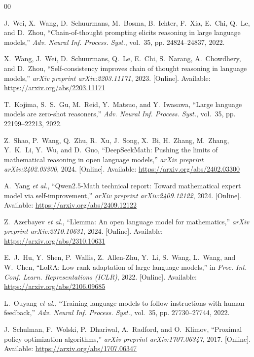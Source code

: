 \documentclass{ieeeaccess}
\begin{document}
\begin{thebibliography}{00}

J.~Wei, X.~Wang, D.~Schuurmans, M.~Bosma, B.~Ichter, F.~Xia, E.~Chi,
Q.~Le, and D.~Zhou,
``Chain-of-thought prompting elicits reasoning in large language models,''
\emph{Adv. Neural Inf. Process. Syst.}, vol.~35, pp. 24824--24837, 2022.

X.~Wang, J.~Wei, D.~Schuurmans, Q.~Le, E.~Chi, S.~Narang, A.~Chowdhery,
and D.~Zhou,
``Self-consistency improves chain of thought reasoning in language models,''
\emph{arXiv preprint arXiv:2203.11171}, 2023. [Online]. Available:
\underline{https://arxiv.org/abs/2203.11171}

T.~Kojima, S.~S.~Gu, M.~Reid, Y.~Matsuo, and Y.~Iwasawa,
``Large language models are zero-shot reasoners,''
\emph{Adv. Neural Inf. Process. Syst.}, vol.~35, pp. 22199--22213, 2022.

Z.~Shao, P.~Wang, Q.~Zhu, R.~Xu, J.~Song, X.~Bi, H.~Zhang, M.~Zhang,
Y.~K.~Li, Y.~Wu, and D.~Guo,
``{DeepSeekMath}: Pushing the limits of mathematical reasoning in open
language models,''
\emph{arXiv preprint arXiv:2402.03300}, 2024. [Online]. Available:
\underline{https://arxiv.org/abs/2402.03300}

A.~Yang \emph{et al.},
``{Qwen2.5-Math} technical report: Toward mathematical expert model via
self-improvement,''
\emph{arXiv preprint arXiv:2409.12122}, 2024. [Online]. Available:
\underline{https://arxiv.org/abs/2409.12122}

Z.~Azerbayev \emph{et al.},
``{Llemma}: An open language model for mathematics,''
\emph{arXiv preprint arXiv:2310.10631}, 2024. [Online]. Available:
\underline{https://arxiv.org/abs/2310.10631}

E.~J.~Hu, Y.~Shen, P.~Wallis, Z.~Allen-Zhu, Y.~Li, S.~Wang, L.~Wang,
and W.~Chen,
``{LoRA}: Low-rank adaptation of large language models,''
in \emph{Proc. Int. Conf. Learn. Representations (ICLR)}, 2022.
[Online]. Available: \underline{https://arxiv.org/abs/2106.09685}

L.~Ouyang \emph{et al.},
``Training language models to follow instructions with human feedback,''
\emph{Adv. Neural Inf. Process. Syst.}, vol.~35, pp. 27730--27744, 2022.

J.~Schulman, F.~Wolski, P.~Dhariwal, A.~Radford, and O.~Klimov,
``Proximal policy optimization algorithms,''
\emph{arXiv preprint arXiv:1707.06347}, 2017. [Online]. Available:
\underline{https://arxiv.org/abs/1707.06347}


\end{thebibliography}
\end{document}

